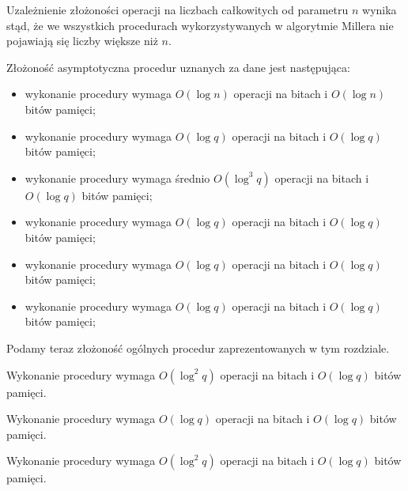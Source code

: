 \begin{remark}
Uzależnienie złożoności operacji na liczbach całkowitych od parametru $n$
wynika stąd,
że we wszystkich procedurach wykorzystywanych w algorytmie Millera
nie pojawiają się liczby większe niż $n$.
\end{remark}

\begin{remark}
Złożoność asymptotyczna procedur uznanych za dane jest następująca:
\begin{itemize}
\item
wykonanie procedury 
wymaga $O(\log n)$ operacji na bitach i $O(\log n)$ bitów pamięci;
\item
wykonanie procedury 
wymaga $O(\log q)$ operacji na bitach i $O(\log q)$ bitów pamięci;
\item
wykonanie procedury 
wymaga średnio $O(\log^3 q)$ operacji na bitach i $O(\log q)$ bitów pamięci;
\item
wykonanie procedury 
wymaga $O(\log q)$ operacji na bitach i $O(\log q)$ bitów pamięci;
\item
wykonanie procedury 
wymaga $O(\log q)$ operacji na bitach i $O(\log q)$ bitów pamięci;
\item
wykonanie procedury 
wymaga $O(\log q)$ operacji na bitach i $O(\log q)$ bitów pamięci;
\end{itemize}
\end{remark}

\noindent
Podamy teraz złożoność ogólnych procedur
zaprezentowanych w tym rozdziale.

\begin{fact}
Wykonanie procedury 
wymaga $O(\log^2 q)$ operacji na bitach i $O(\log q)$ bitów pamięci.
\end{fact}

\begin{fact}
Wykonanie procedury 
wymaga \linebreak $O(\log q)$ operacji na bitach i $O(\log q)$ bitów pamięci.
\end{fact}

\begin{fact}
Wykonanie procedury 
wymaga $O(\log^2 q)$ operacji na bitach i $O(\log q)$ bitów pamięci.
\end{fact}

